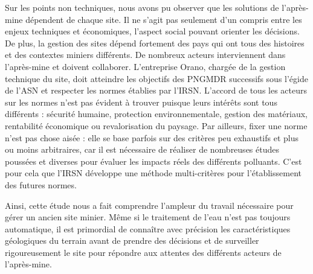\documentclass{article}
\begin{document}
Sur les points non techniques, nous avons pu observer que les solutions de l'après-mine dépendent de chaque site. Il ne s'agit pas seulement d'un compris entre les enjeux techniques et économiques, l'aspect social pouvant orienter les décisions. De plus, la gestion des sites dépend fortement des pays qui ont tous des histoires et des contextes miniers différents. De nombreux acteurs interviennent dans l'après-mine et doivent collaborer. L'entreprise Orano, chargée de la gestion technique du site, doit atteindre les objectifs des PNGMDR successifs sous l'égide de l'ASN et respecter les normes établies par l'IRSN. L'accord de tous les acteurs sur les normes n'est pas évident à trouver puisque leurs intérêts sont tous différents : sécurité humaine, protection environnementale, gestion des matériaux, rentabilité économique ou revalorisation du paysage. Par ailleurs, fixer une norme n'est pas chose aisée : elle se base parfois sur des critères peu exhaustifs et plus ou moins arbitraires, car il est nécessaire de réaliser de nombreuses études poussées et diverses pour évaluer les impacts réels des différents polluants. C'est pour cela que l'IRSN développe une méthode multi-critères pour l'établissement des futures normes.

Ainsi, cette étude nous a fait comprendre l'ampleur du travail nécessaire pour gérer un ancien site minier. Même si le traitement de l'eau n'est pas toujours automatique, il est primordial de connaître avec précision les caractéristiques géologiques du terrain avant de prendre des décisions et de surveiller rigoureusement le site pour répondre aux attentes des différents acteurs de l'après-mine.

\end{document}
